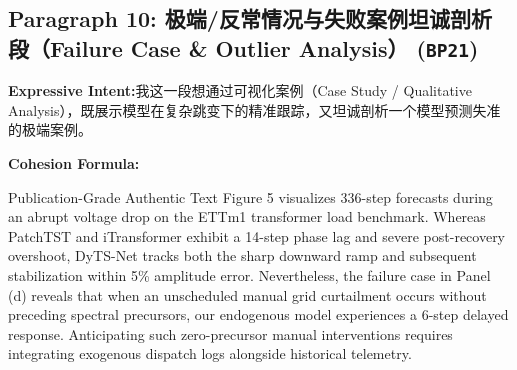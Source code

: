 \subsection*{Paragraph 10: 极端/反常情况与失败案例坦诚剖析段（Failure Case \& Outlier Analysis） (\texttt{BP21})}
\noindent\textbf{Expressive Intent:}\enspace 我这一段想通过可视化案例（Case Study / Qualitative Analysis），既展示模型在复杂跳变下的精准跟踪，又坦诚剖析一个模型预测失准的极端案例。\par
\noindent\textbf{Cohesion Formula:}\par\vspace{4pt}
\begin{ExampleBox}{Publication-Grade Authentic Text}
Figure 5 visualizes 336-step forecasts during an abrupt voltage drop on the ETTm1 transformer load benchmark. Whereas PatchTST and iTransformer exhibit a 14-step phase lag and severe post-recovery overshoot, DyTS-Net tracks both the sharp downward ramp and subsequent stabilization within 5\% amplitude error. Nevertheless, the failure case in Panel (d) reveals that when an unscheduled manual grid curtailment occurs without preceding spectral precursors, our endogenous model experiences a 6-step delayed response. Anticipating such zero-precursor manual interventions requires integrating exogenous dispatch logs alongside historical telemetry.
\end{ExampleBox}
